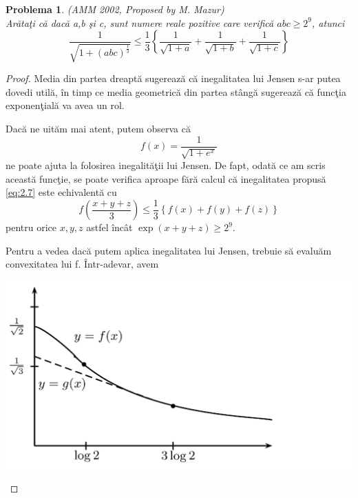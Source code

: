\documentclass[a4paper,12pt,oneside]{report}
\newtheorem{problem}{Problema}
\begin{document}
\begin{problem}(AMM 2002, Proposed by M. Mazur)\\
Ar\u{a}ta\c{t}i c\u{a} dac\u{a} a,b \c{s}i c, sunt numere reale pozitive care verific\u{a} \(abc \geq 2^{9}\), atunci
\begin{displaymath}
  \frac{1}{\sqrt{1 + \left ( abc \right )^{\frac{1}{3}}}}\leq \frac{1}{3}\left \{ \frac{1}{\sqrt{1 + a}} + \frac{1}{\sqrt{1 + b}} + \frac{1}{\sqrt{1 + c}}\right \}    	
  \label{eq:2.7} \tag{2.7}
\end{displaymath}
\end{problem}
\begin{proof}
Media din partea dreapt\u{a} sugereaz\u{a} c\u{a} inegalitatea lui Jensen s-ar putea dovedi util\u{a}, \^{i}n timp ce media geometric\u{a} din partea st\^{a}ng\u{a} sugereaz\u{a} c\u{a} func\c{t}ia exponen\c{t}ial\u{a} va avea un rol.

Dac\u{a} ne uit\u{a}m mai atent, putem observa c\u{a}
\begin{displaymath}
  f\left ( x \right ) = \frac{1}{\sqrt{1+ e^{x}}}
\end{displaymath}
ne poate ajuta la folosirea inegalit\u{a}\c{t}ii lui Jensen. De fapt, odat\u{a} ce am scris aceast\u{a} func\c{t}ie, se poate verifica aproape f\u{a}r\u{a} calcul c\u{a} inegalitatea propus\u{a} \ref{eq:2.7} este echivalent\u{a} cu
\begin{displaymath}
  f\left ( \frac{x + y + z}{3} \right )\leq \frac{1}{3}\left \{ f\left ( x \right ) + f\left ( y \right ) + f\left ( z \right ) \right \}    \label{eq:2.8} \tag{2.8}
\end{displaymath}
pentru orice $x, y, z$ astfel \^{i}nc\^{a}t \(\exp\left ( x + y + z \right )\geq 2^{9}.\)

Pentru a vedea dac\u{a} putem aplica inegalitatea lui Jensen, trebuie s\u{a} evalu\u{a}m convexitatea lui f. \^{I}ntr-adevar, avem

\begin{center}
	\includegraphics[width=1.0\textwidth]{fig_pb3.png}
\end{center}


\end{proof}
\end{document}

